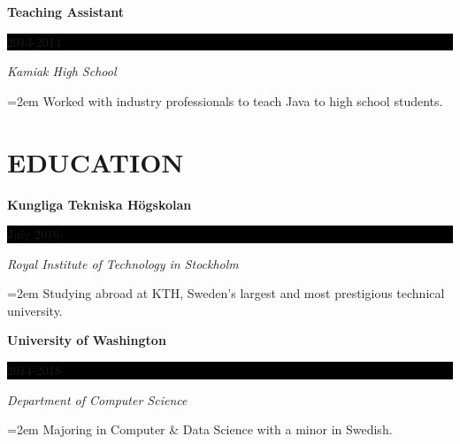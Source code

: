 \documentclass[paper=a4,fontsize=11pt]{scrartcl} %
\newcommand{\sepspace}{\vspace*{1em}}       %
\newcommand{\NewPart}[1]{\section*{\uppercase{#1}}}
\newcommand{\EducationEntry}[4]{
        \noindent \textbf{#1} \hfill      %
        \colorbox{Black}{%
            \parbox{6em}{%
            \hfill\color{White}#2}} \par  %
        \noindent \textit{#3} \par        %
        \noindent\hangindent=2em\hangafter=0 \small #4 %
        \normalsize \par}
\begin{document}
\EducationEntry{Teaching Assistant}{2013-2014}{Kamiak High School}{Worked with industry professionals to teach Java to high school students.}

\NewPart{Education}{}
\EducationEntry{Kungliga Tekniska Högskolan}{July 2016-}{Royal Institute of Technology in Stockholm}{Studying abroad at KTH, Sweden’s largest and most prestigious technical university.}
\sepspace

\EducationEntry{University of Washington}{2014-2018}{Department of Computer Science}{Majoring in Computer \& Data Science with a minor in Swedish. }
\end{document}
